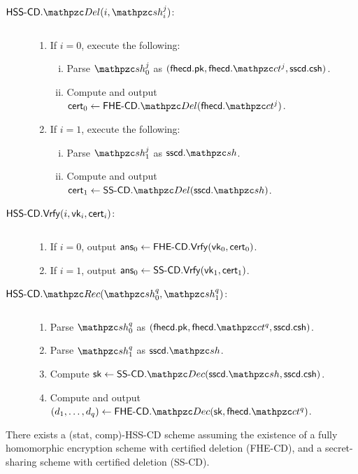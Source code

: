 \begin{description}
\item[$\HSScd.\Del(i, \qsh_i^j)$:] $ $
\begin{enumerate}
\item If $i = 0$, execute the following:
\begin{enumerate}[(i)]
\item Parse $\qsh_0^j$ as $(\fhecd.\pk, \fhecd.\qct^j, \sscd.\csh)$.
\item Compute and output $\cert_0 \leftarrow
\FHEcd.\Del(\fhecd.\qct^j)$.
\end{enumerate}
\item If $i = 1$, execute the following:
\begin{enumerate}[(i)]
\item Parse $\qsh_1^j$ as $\sscd.\qsh$.
\item Compute and output $\cert_1 \leftarrow
\SScd.\Del(\sscd.\qsh)$.
\end{enumerate}
\end{enumerate}

\item[$\mathsf{HSS\textrm{-}CD}.\mathsf{Vrfy}(i, \mathsf{vk}_i, \mathsf{cert}_i)$:] $ $

\begin{enumerate}
\item If $i = 0$, output $\mathsf{ans}_0 \leftarrow \mathsf{FHE\textrm{-}CD}.\mathsf{Vrfy}(\mathsf{vk}_0,
\mathsf{cert}_0)$.
\item If $i = 1$, output $\mathsf{ans}_0 \leftarrow \mathsf{SS\textrm{-}CD}.\mathsf{Vrfy}(\mathsf{vk}_1,
\mathsf{cert}_1)$.
\end{enumerate}

\item[$\HSScd.\Rec(\qsh_0^q, \qsh_1^q)$:] $ $

\begin{enumerate}
\item Parse $\qsh_0^q$ as $(\fhecd.\pk, \fhecd.\qct^q, \sscd.\csh)$.
\item Parse $\qsh_1^q$ as $\sscd.\qsh$.
\item Compute $\sk \leftarrow \SScd.\qDec(\sscd.\qsh, \sscd.\csh)$.
\item Compute and output $(d_1, \ldots, d_q) \leftarrow
\FHEcd.\qDec(\sk, \fhecd.\qct^q)$.

\end{enumerate}


\end{description}

\begin{theorem}
There exists a (stat, comp)-HSS-CD scheme assuming the existence of
a fully homomorphic encryption scheme with certified deletion
(FHE-CD), and a secret-sharing scheme with certified deletion
(SS-CD).
\end{theorem}

